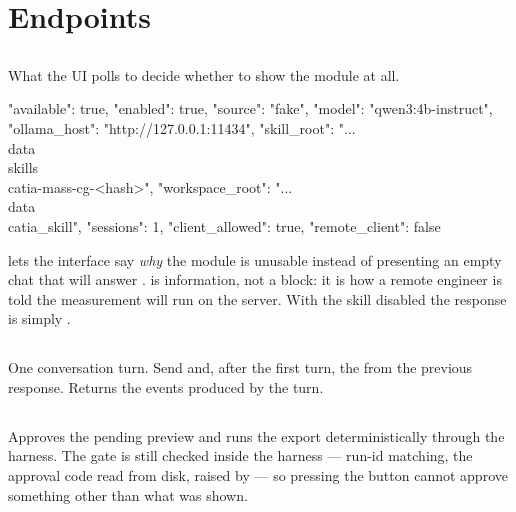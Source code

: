 
\section{Endpoints}

\subsection*{}

What the UI polls to decide whether to show the module at all.

\begin{jsonblock}
{
  "available": true,
  "enabled": true,
  "source": "fake",
  "model": "qwen3:4b-instruct",
  "ollama_host": "http://127.0.0.1:11434",
  "skill_root": "...\\data\\skills\\catia-mass-cg-<hash>",
  "workspace_root": "...\\data\\catia_skill",
  "sessions": 1,
  "client_allowed": true,
  "remote_client": false
}
\end{jsonblock}

 lets the interface say \emph{why} the module is unusable
instead of presenting an empty chat that will answer .
 is information, not a block: it is how a remote engineer is
told the measurement will run on the server. With the skill disabled the
response is simply .

\subsection*{}

One conversation turn. Send  and, after the first turn, the
 from the previous response. Returns the events produced by the
turn.

\subsection*{}

Approves the pending preview and runs the export deterministically through the
harness. The gate is still checked inside the harness --- run-id matching, the
approval code read from disk,  raised by  ---
so pressing the button cannot approve something other than what was shown.

